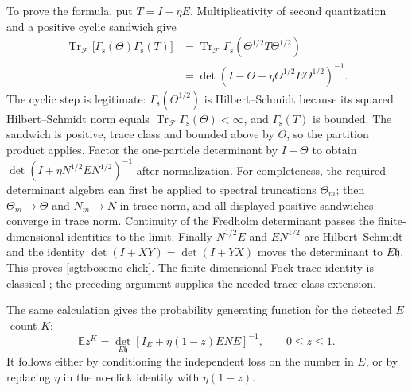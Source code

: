 \documentclass[aps,pra,reprint,superscriptaddress,longbibliography]{revtex4-2}
\newcommand{\Tr}{\operatorname{Tr}}
\begin{document}
To prove the formula, put $T=I-\eta E$.  Multiplicativity of second
quantization and a positive cyclic sandwich give
\begin{align*}
 \Tr_{\mathcal F}\bigl[\Gamma_{\mathrm s}(\Theta)
                                \Gamma_{\mathrm s}(T)\bigr]
 &=\Tr_{\mathcal F}\Gamma_{\mathrm s}
                  (\Theta^{1/2}T\Theta^{1/2})\\
 &=\det(I-\Theta+\eta\Theta^{1/2}E\Theta^{1/2})^{-1}.
\end{align*}
The cyclic step is legitimate: $\Gamma_{\mathrm s}(\Theta^{1/2})$ is
Hilbert--Schmidt because its squared Hilbert--Schmidt norm equals
$\Tr_{\mathcal F}\Gamma_{\mathrm s}(\Theta)<\infty$, and
$\Gamma_{\mathrm s}(T)$ is bounded.  The sandwich is positive, trace
class and bounded above by $\Theta$, so the partition product applies.
Factor the one-particle determinant by $I-\Theta$ to obtain
$\det(I+\eta N^{1/2}EN^{1/2})^{-1}$ after normalization.
For completeness, the required determinant algebra can first be applied
to spectral truncations $\Theta_m$; then
$\Theta_m\to\Theta$ and $N_m\to N$ in trace norm, and all displayed
positive sandwiches converge in trace norm.  Continuity of the
Fredholm determinant passes the finite-dimensional identities to the
limit.  Finally $N^{1/2}E$ and $EN^{1/2}$ are Hilbert--Schmidt and the
identity $\det(I+XY)=\det(I+YX)$ moves the determinant to
$E\mathfrak h$.  This proves \eqref{sgt:bose:no-click}.  The
finite-dimensional Fock trace identity is classical
\cite{Klich2002}; the preceding argument supplies the needed trace-class
extension.

The same calculation gives the probability generating function for the
detected $E$-count $K$:
\begin{equation}
 \mathbb E z^K
   =\det_{E\mathfrak h}
       [I_E+\eta(1-z)ENE]^{-1},\qquad 0\le z\le1.
 \label{sgt:bose:pgf}
\end{equation}
It follows either by conditioning the independent loss on the number
in $E$, or by replacing $\eta$ in the no-click identity with
$\eta(1-z)$.
\end{document}
